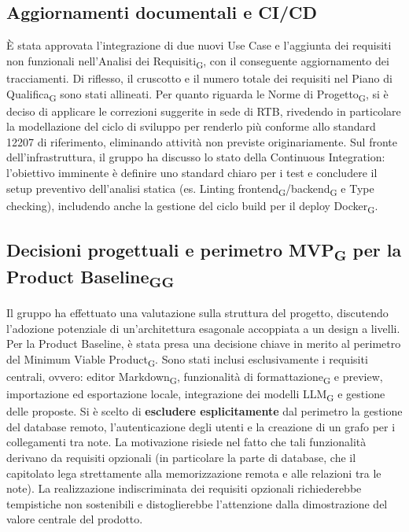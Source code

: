 \subsection{Aggiornamenti documentali e CI/CD}
È stata approvata l'integrazione di due nuovi Use Case e l'aggiunta dei requisiti non funzionali nell'Analisi dei Requisiti\textsubscript{G}, con il conseguente aggiornamento dei tracciamenti. Di riflesso, il cruscotto e il numero totale dei requisiti nel Piano di Qualifica\textsubscript{G} sono stati allineati.
Per quanto riguarda le Norme di Progetto\textsubscript{G}, si è deciso di applicare le correzioni suggerite in sede di RTB, rivedendo in particolare la modellazione del ciclo di sviluppo per renderlo più conforme allo standard 12207 di riferimento, eliminando attività non previste originariamente.
Sul fronte dell'infrastruttura, il gruppo ha discusso lo stato della Continuous Integration: l'obiettivo imminente è definire uno standard chiaro per i test e concludere il setup preventivo dell'analisi statica (es. Linting frontend\textsubscript{G}/backend\textsubscript{G} e Type checking), includendo anche la gestione del ciclo build per il deploy Docker\textsubscript{G}.

\subsection{Decisioni progettuali e perimetro MVP\textsubscript{G} per la Product Baseline\textsubscript{G}\textsubscript{G}}
Il gruppo ha effettuato una valutazione sulla struttura del progetto, discutendo l'adozione potenziale di un'architettura esagonale accoppiata a un design a livelli. Per la Product Baseline, è stata presa una decisione chiave in merito al perimetro del Minimum Viable Product\textsubscript{G}. Sono stati inclusi esclusivamente i requisiti centrali, ovvero: editor Markdown\textsubscript{G}, funzionalità di formattazione\textsubscript{G} e preview, importazione ed esportazione locale, integrazione dei modelli LLM\textsubscript{G} e gestione delle proposte. 
Si è scelto di \textbf{escludere esplicitamente} dal perimetro la gestione del database remoto, l'autenticazione degli utenti e la creazione di un grafo per i collegamenti tra note. La motivazione risiede nel fatto che tali funzionalità derivano da requisiti opzionali (in particolare la parte di database, che il capitolato lega strettamente alla memorizzazione remota e alle relazioni tra le note). La realizzazione indiscriminata dei requisiti opzionali richiederebbe tempistiche non sostenibili e distoglierebbe l'attenzione dalla dimostrazione del valore centrale del prodotto.

